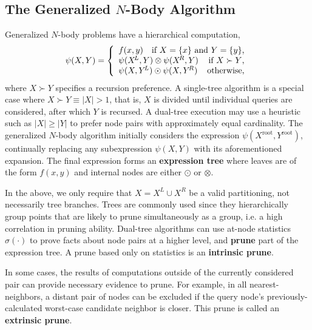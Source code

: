 \documentclass[twoside,leqno,twocolumn]{article}
\newcommand{\union}{\cup}
\newcommand{\prefsplit}[2]{#1 \succ #2}
\newcommand{\gnp}{\psi}
\newcommand{\mysub}[1]{\subsection{#1} }
\newcommand{\defterm}[1]{{\bf #1}}
\newcommand{\kdroot}[1]{#1^{\text{root}}}
\newcommand{\kdleft}[1]{#1^{\!L}}
\newcommand{\kdright}[1]{#1^{\!R}}
\newcommand{\outstat}{\sigma}
\begin{document}
\mysub{The Generalized $N$-Body Algorithm}
Generalized $N$-body problems have a hierarchical computation,
\[
\gnp(X,Y) = \left\{ \begin{array}{lrr}
    f(x,y) & \multicolumn{2}{r}{\text{if }X = \{x\}\text{ and }Y = \{y\}\text{,}}
    \\
    \multicolumn{2}{l}{\gnp(\kdleft{X},Y) \otimes \gnp(\kdright{X}, Y)} & \text{if }\prefsplit{X}{Y}\text{,}
    \\
    \multicolumn{2}{l}{\gnp(X,\kdleft{Y}) \odot \gnp(X,\kdright{Y})} & \text{otherwise,}
  \end{array}
\right.
\]
\noindent
where $\prefsplit{X}{Y}$ specifies a recursion preference.
A single-tree algorithm is a special case where $\prefsplit{X}{Y} \equiv |X| > 1$, that is, $X$ is divided until individual queries are considered, after which $Y$ is recursed.
A dual-tree execution may use a heuristic such as $|X| \geq |Y|$ to prefer node pairs with approximately equal cardinality.
The generalized $N$-body algorithm initially considers the expression $\gnp(\kdroot{X}, \kdroot{Y})$, continually replacing any subexpression $\gnp(X, Y)$ with its aforementioned expansion.
The final expression forms an \defterm{expression tree} where leaves are of the form $f(x,y)$ and internal nodes are either $\odot$ or $\otimes$.

In the above, we only require that $X = \kdleft{X} \union \kdright{X}$ be a valid partitioning, not necessarily tree branches.
Trees are commonly used since they hierarchically group points that are likely to prune simultaneously as a group, i.e. a high correlation in pruning ability.
Dual-tree algorithms can use at-node statistics $\outstat(\cdot)$ to prove facts about node pairs at a higher level, and \defterm{prune} part of the expression tree.
A prune based only on statistics is an \defterm{intrinsic prune}.

In some cases, the results of computations outside of the currently considered pair can provide necessary evidence to prune.
For example, in all nearest-neighbors, a distant pair of nodes can be excluded if the query node's previously-calculated worst-case candidate neighbor is closer.
This prune is called an \defterm{extrinsic prune}.
\end{document}
